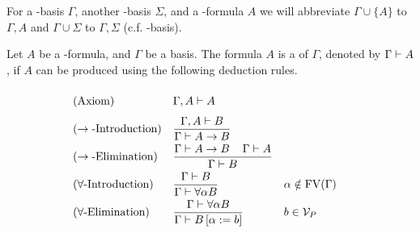 For a \SysP-basis $\Gamma$, another \SysP-basis $\Sigma$, and a \SysP-formula $A$ we will abbreviate $\Gamma\cup\{A\}$ to $\Gamma,A$ and $\Gamma\cup\Sigma$ to $\Gamma,\Sigma$ (c.f. \lambdaTwo-basis).

\begin{definition}\label{def.3.2}
Let $A$ be a \SysP-formula, and $\Gamma$ be a basis. The formula $A$ is a  of $\Gamma$, denoted by $\Gamma\vdash A$, if $A$ can be produced using the following deduction rules.
\begin{mdframed}
	\begingroup%
	\addtolength{\jot}{0.3cm}
	\begin{align*}
		&(\text{Axiom}) &&\Gamma,A\PModels A\vphantom{\frac{\Gamma}{\Gamma}}\\
		&(\rightarrow\text{-Introduction}) &&\frac{\Gamma,A\PModels B}{\Gamma\PModels A\to B}\\
		&(\rightarrow\text{-Elimination}) &&\frac{\Gamma\PModels A\to B \hspace{0.4cm}\Gamma\PModels A}{\Gamma\PModels B}\\ %
		  & (\forall\text{-Introduction}) &   & \frac{\Gamma\PModels B}{\Gamma\PModels \forall\alpha B} &   & \alpha\notin\FV(\Gamma) \\
		&(\forall\text{-Elimination}) &&\frac{\Gamma\PModels \forall\alpha B }{\Gamma\PModels B\left[ \alpha:=b\right] }
		&& b\in\VarP %
	\end{align*}
	\endgroup
\end{mdframed}
\end{definition}

